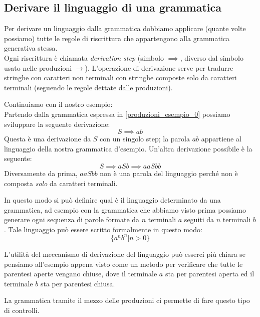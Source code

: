 \documentclass[class=book, crop=false, oneside]{standalone}
\begin{document}
\subsection{Derivare il linguaggio di una grammatica}
Per derivare un linguaggio dalla grammatica dobbiamo applicare (quante volte possiamo) tutte le regole di riscrittura che appartengono alla grammatica generativa stessa.\\
Ogni riscrittura è chiamata \emph{derivation step} (simbolo $\implies$, diverso dal simbolo usato nelle produzioni $\to$).
L’operazione di derivazione serve per tradurre stringhe con caratteri non terminali con stringhe composte solo da caratteri terminali (seguendo le regole dettate dalle produzioni).


Continuiamo con il nostro esempio:\\
Partendo dalla grammatica espressa in \ref{produzioni_esempio_0} possiamo sviluppare la seguente derivazione:
\begin{equation}
    S \implies ab
\end{equation}
Questa è una derivazione da $S$ con un singolo step; la parola $ab$ appartiene al linguaggio della nostra grammatica d’esempio.
Un'altra derivazione possibile è la seguente:
\begin{equation}
    S \implies aSb \implies aaSbb
\end{equation}
Diversamente da prima, $aaSbb$ non è una parola del linguaggio perché non è composta \emph{solo} da caratteri terminali.

In questo modo si può definire qual è il linguaggio determinato da una grammatica, ad esempio con la grammatica che abbiamo visto prima possiamo generare ogni sequenza di parole formate da $n$ terminali $a$ seguiti da $n$ terminali $b$.
Tale linguaggio può essere scritto formalmente in questo modo:
\begin{equation}
    \{a^n b^n |n>0\}
\end{equation}


L'utilità del meccanismo di derivazione del linguaggio può esserci più chiara se pensiamo all'esempio appena visto come un metodo per verificare che tutte le parentesi aperte vengano chiuse, dove il terminale $a$ sta per parentesi aperta ed il terminale $b$ sta per parentesi chiusa.

La grammatica tramite il mezzo delle produzioni ci permette di fare questo tipo di controlli.
\end{document}
